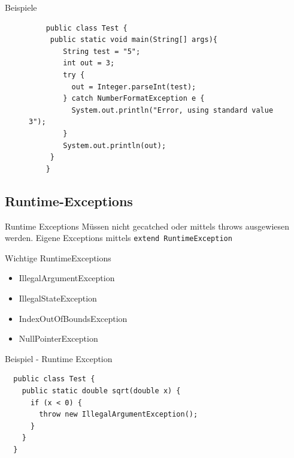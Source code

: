 \documentclass[18pt]{beamer}
\begin{document}
\begin{frame}[fragile]{Beispiele}
\begin{figure}
   \begin{lstlisting}
    public class Test {
	 public static void main(String[] args){
	    String test = "5";
	    int out = 3;
	    try {
	      out = Integer.parseInt(test);
	    } catch NumberFormatException e {
	      System.out.println("Error, using standard value 3");
	    }
	    System.out.println(out);
	 }
    }
  \end{lstlisting}
\end{figure}
\vfill
{}

\end{frame}

\subsection{Runtime-Exceptions}
\begin{frame}[fragile]{Runtime Exceptions}
 Müssen nicht gecatched oder mittels throws ausgewiesen werden.
 Eigene Exceptions mittels \verb|extend RuntimeException|
 
 Wichtige RuntimeExceptions
 \begin{itemize}
  \item IllegalArgumentException
  \item IllegalStateException
  \item IndexOutOfBoundsException
  \item NullPointerException
 \end{itemize}

\end{frame}

\begin{frame}[fragile]{Beispiel - Runtime Exception}
 \begin{lstlisting}
  public class Test {
    public static double sqrt(double x) {
      if (x < 0) {
        throw new IllegalArgumentException();
      }
    }
  }
 \end{lstlisting}

\end{frame}
\end{document}

